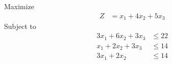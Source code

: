 \documentclass[12pt]{article}
\begin{document}
\subsection{}
Maximize
\begin{align*}
Z                    & = x_{1}+4x_{2}+5x_{3}
\end{align*}
Subject to
\begin{align*}
3x_{1}+6x_{2}+3x_{3} & \le 22                                                                                                                                                   \\
x_{1}+2x_{2}+3x_{3}  & \le 14                                                                                                                                                   \\
3x_{1}+2x_{2}        & \le 14                                                                                                                                                   \\
\end{align*}
\end{document}
